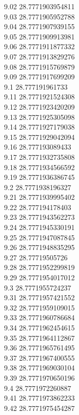 {9.02	28.7771903954811\\
9.03	28.7771905952788\\
9.04	28.7771907939155\\
9.05	28.7771909913981\\
9.06	28.7771911877332\\
9.07	28.7771913829276\\
9.08	28.7771915769879\\
9.09	28.7771917699209\\
9.1	28.777191961733\\
9.11	28.7771921524308\\
9.12	28.7771923420209\\
9.13	28.7771925305098\\
9.14	28.7771927179038\\
9.15	28.7771929042094\\
9.16	28.777193089433\\
9.17	28.7771932735808\\
9.18	28.7771934566592\\
9.19	28.7771936386745\\
9.2	28.7771938196327\\
9.21	28.7771939995402\\
9.22	28.777194178403\\
9.23	28.7771943562273\\
9.24	28.7771945330191\\
9.25	28.7771947087845\\
9.26	28.7771948835295\\
9.27	28.77719505726\\
9.28	28.7771952299819\\
9.29	28.7771954017012\\
9.3	28.7771955724237\\
9.31	28.7771957421552\\
9.32	28.7771959109015\\
9.33	28.7771960786684\\
9.34	28.7771962454615\\
9.35	28.7771964112867\\
9.36	28.7771965761495\\
9.37	28.7771967400555\\
9.38	28.7771969030104\\
9.39	28.7771970650196\\
9.4	28.7771972260887\\
9.41	28.7771973862233\\
9.42	28.7771975454287\\
}
